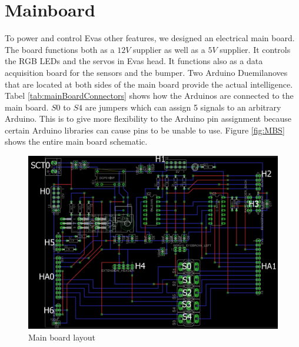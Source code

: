 \documentclass[technical_document.tex]{subfiles}
\begin{document}
\newpage
\section{Mainboard}
To power and control Eva\textquotesingle s other features, we designed an electrical main board. The board functions both as a $12V$ supplier as well as a $5V$ supplier. It controls the RGB LEDs and the servos in Eva\textquotesingle s head. It functions also as a data acquisition board for the sensors and the bumper.
Two Arduino Duemilanoves that are located at both sides of the main board provide the actual intelligence. Tabel \ref{tab:mainBoardConnectors} shows how the Arduinos are connected to the main board. $S0$ to $S4$ are jumpers which can assign 5 signals to an arbitrary Arduino. This is to give more flexibility to the Arduino pin assignment because certain Arduino libraries can cause pins to be unable to use. Figure \ref{fig:MBS} shows the entire main board schematic.


 \begin{figure}[ht!]
	\centering
	\mbox{\includegraphics[scale=1.0]{Images/MainBoard_Specs.png}}
	\caption{Main board layout}
	\label{fig:main_board_layout}
\end{figure}
\end{document}
